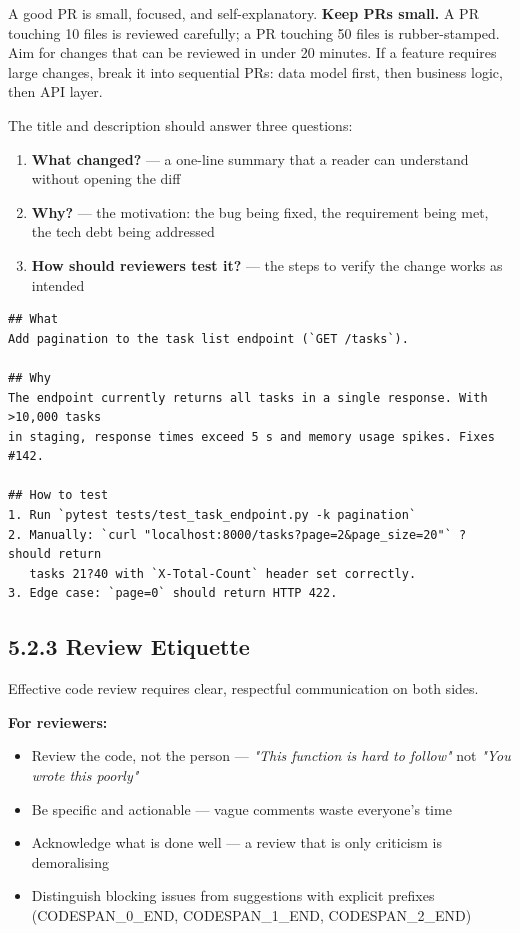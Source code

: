 \documentclass[11pt,a4paper]{book}
\begin{document}
A good PR is small, focused, and self-explanatory. \textbf{Keep PRs small.} A PR touching 10 files is reviewed carefully; a PR touching 50 files is rubber-stamped. Aim for changes that can be reviewed in under 20 minutes. If a feature requires large changes, break it into sequential PRs: data model first, then business logic, then API layer.

The title and description should answer three questions:

\begin{enumerate}
  \item \textbf{What changed?} --- a one-line summary that a reader can understand without opening the diff
  \item \textbf{Why?} --- the motivation: the bug being fixed, the requirement being met, the tech debt being addressed
  \item \textbf{How should reviewers test it?} --- the steps to verify the change works as intended
\end{enumerate}

\begin{lstlisting}
## What
Add pagination to the task list endpoint (`GET /tasks`).

## Why
The endpoint currently returns all tasks in a single response. With >10,000 tasks
in staging, response times exceed 5 s and memory usage spikes. Fixes #142.

## How to test
1. Run `pytest tests/test_task_endpoint.py -k pagination`
2. Manually: `curl "localhost:8000/tasks?page=2&page_size=20"` ? should return
   tasks 21?40 with `X-Total-Count` header set correctly.
3. Edge case: `page=0` should return HTTP 422.
\end{lstlisting}

\subsection{5.2.3 Review Etiquette}

Effective code review requires clear, respectful communication on both sides.

\textbf{For reviewers:}
\begin{itemize}
  \item Review the code, not the person --- \textit{"This function is hard to follow"} not \textit{"You wrote this poorly"}
  \item Be specific and actionable --- vague comments waste everyone's time
  \item Acknowledge what is done well --- a review that is only criticism is demoralising
  \item Distinguish blocking issues from suggestions with explicit prefixes (CODESPAN\_0\_END, CODESPAN\_1\_END, CODESPAN\_2\_END)
\end{itemize}
\end{document}
